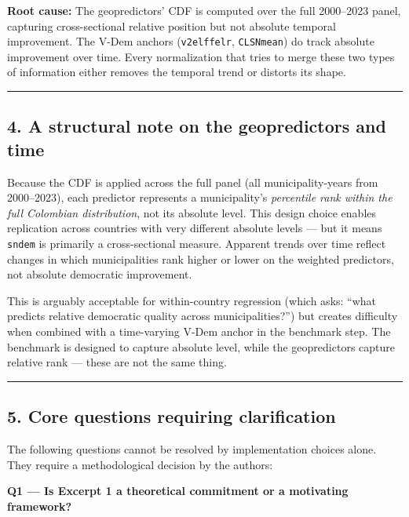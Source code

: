 \documentclass[
]{article}
\begin{document}
\textbf{Root cause:} The geopredictors' CDF is computed over the full
2000--2023 panel, capturing cross-sectional relative position but not
absolute temporal improvement. The V-Dem anchors (\texttt{v2elffelr},
\texttt{CLSNmean}) do track absolute improvement over time. Every
normalization that tries to merge these two types of information either
removes the temporal trend or distorts its shape.

\begin{center}\rule{0.5\linewidth}{0.5pt}\end{center}

\subsection{4. A structural note on the geopredictors and
time}\label{a-structural-note-on-the-geopredictors-and-time}

Because the CDF is applied across the full panel (all municipality-years
from 2000--2023), each predictor represents a municipality's
\emph{percentile rank within the full Colombian distribution}, not its
absolute level. This design choice enables replication across countries
with very different absolute levels --- but it means \texttt{sndem} is
primarily a cross-sectional measure. Apparent trends over time reflect
changes in which municipalities rank higher or lower on the weighted
predictors, not absolute democratic improvement.

This is arguably acceptable for within-country regression (which asks:
``what predicts relative democratic quality across municipalities?'')
but creates difficulty when combined with a time-varying V-Dem anchor in
the benchmark step. The benchmark is designed to capture absolute level,
while the geopredictors capture relative rank --- these are not the same
thing.

\begin{center}\rule{0.5\linewidth}{0.5pt}\end{center}

\subsection{5. Core questions requiring
clarification}\label{core-questions-requiring-clarification}

The following questions cannot be resolved by implementation choices
alone. They require a methodological decision by the authors:

\textbf{Q1 --- Is Excerpt 1 a theoretical commitment or a motivating
framework?}
\end{document}
